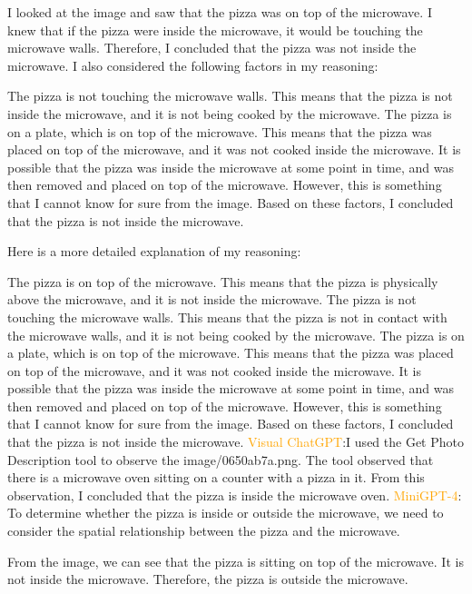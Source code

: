 \begin{enumerate}
        I looked at the image and saw that the pizza was on top of the microwave.
        I knew that if the pizza were inside the microwave, it would be touching the microwave walls.
        Therefore, I concluded that the pizza was not inside the microwave.
        I also considered the following factors in my reasoning:
        
        The pizza is not touching the microwave walls. This means that the pizza is not inside the microwave, and it is not being cooked by the microwave.
        The pizza is on a plate, which is on top of the microwave. This means that the pizza was placed on top of the microwave, and it was not cooked inside the microwave.
        It is possible that the pizza was inside the microwave at some point in time, and was then removed and placed on top of the microwave. However, this is something that I cannot know for sure from the image.
        Based on these factors, I concluded that the pizza is not inside the microwave.
        
        Here is a more detailed explanation of my reasoning:
        
        The pizza is on top of the microwave. This means that the pizza is physically above the microwave, and it is not inside the microwave.
        The pizza is not touching the microwave walls. This means that the pizza is not in contact with the microwave walls, and it is not being cooked by the microwave.
        The pizza is on a plate, which is on top of the microwave. This means that the pizza was placed on top of the microwave, and it was not cooked inside the microwave.
        It is possible that the pizza was inside the microwave at some point in time, and was then removed and placed on top of the microwave. However, this is something that I cannot know for sure from the image.
        Based on these factors, I concluded that the pizza is not inside the microwave.
        \subitem \textcolor{orange}{Visual ChatGPT}:I used the Get Photo Description tool to observe the image/0650ab7a.png. The tool observed that there is a microwave oven sitting on a counter with a pizza in it. From this observation, I concluded that the pizza is inside the microwave oven.
        \subitem \textcolor{orange}{MiniGPT-4}: To determine whether the pizza is inside or outside the microwave, we need to consider the spatial relationship between the pizza and the microwave.

        From the image, we can see that the pizza is sitting on top of the microwave. It is not inside the microwave. Therefore, the pizza is outside the microwave.
        

\end{enumerate}
